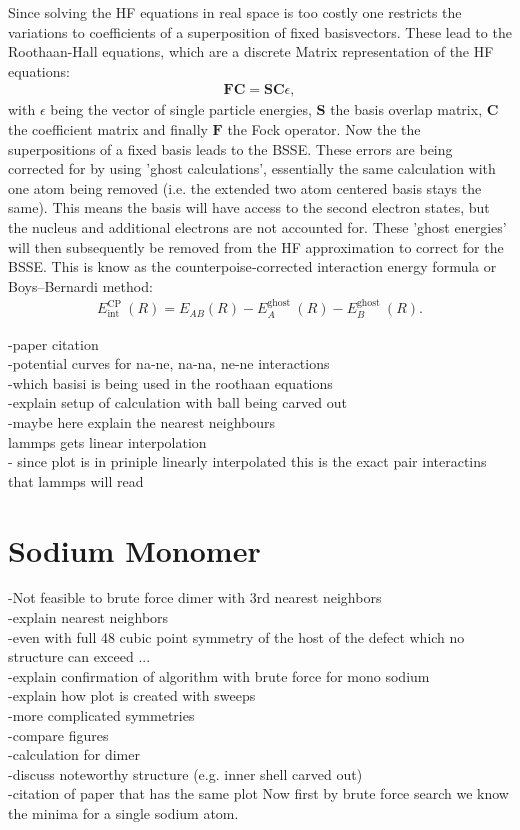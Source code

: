 Since solving the \ac{HF} equations in real space is too costly one restricts the variations to coefficients of a superposition of fixed basisvectors. These lead to the Roothaan-Hall equations, which are a discrete Matrix representation of the \ac{HF} equations:
\begin{align}
	\mathbf{F C}=\mathbf{S C} \epsilon,
\end{align} 
with $\epsilon$ being the vector of single particle energies, $\mathbf{S}$ the basis overlap matrix, $\mathbf{C}$ the coefficient matrix and finally $\mathbf{F}$ the Fock operator. Now the the superpositions of a fixed basis leads to the \ac{BSSE}. These errors are being corrected for by using 'ghost calculations', essentially the same calculation with one atom being removed (i.e. the extended two atom centered basis stays the same). This means the basis will have access to the second electron states, but the nucleus and additional electrons are not accounted for. These 'ghost energies' will then subsequently be removed from the \ac{HF}
approximation to correct for the \ac{BSSE}.
This is know as the counterpoise‐corrected interaction energy formula or Boys–Bernardi method: %
\begin{align}
	E_{\text {int }}^{\text {CP }}(R)=E_{A B}(R)-E_A^{\text {ghost }}(R)-E_B^{\text {ghost }}(R).
\end{align}

-paper citation\\

-potential curves for na-ne, na-na, ne-ne interactions\\
-which basisi is being used in the roothaan equations \\
-explain setup of calculation with ball being carved out\\
-maybe here explain the nearest neighbours\\
lammps gets linear interpolation\\
- since plot is in priniple linearly interpolated this is the exact pair interactins that lammps will read
\section{Sodium Monomer}
-Not feasible to brute force dimer with 3rd nearest neighbors\\
-explain nearest neighbors\\
-even with full 48 cubic point symmetry of the host of the defect which no structure can exceed ...\\ 
-explain confirmation of algorithm with brute force for mono sodium\\
-explain how plot is created with sweeps\\
-more complicated symmetries\\
-compare figures\\
-calculation for dimer\\
-discuss noteworthy structure (e.g. inner shell carved out)\\
-citation of paper that has the same plot
Now first by brute force search we know the minima for a single sodium atom.

